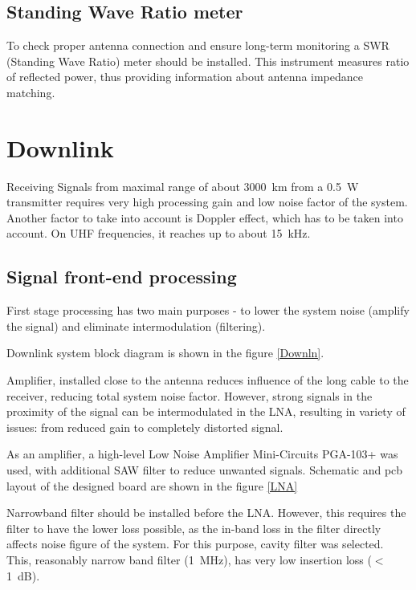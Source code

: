 \subsection{Standing Wave Ratio meter}
To check proper antenna connection and ensure long-term monitoring a SWR (Standing Wave Ratio) meter should be installed. This instrument measures ratio of reflected power, thus providing information about antenna impedance matching.





\section{Downlink}
Receiving Signals from maximal range of about \SI{3000}{\kilo\meter} from a \SI{0.5}{\watt} transmitter requires very high processing gain and low noise factor of the system. Another factor to take into account is Doppler effect, which has to be taken into account. On UHF frequencies, it reaches up to about \SI{15}{\kHz}.

\subsection{Signal front-end processing}
First stage processing has two main purposes - to lower the system noise (amplify the signal) and eliminate intermodulation (filtering).

Downlink system block diagram is shown in the figure \ref{Downln}.


Amplifier, installed close to the antenna reduces influence of the long cable to the receiver, reducing total system noise factor. However, strong signals in the proximity of the signal can be intermodulated in the LNA, resulting in variety of issues: from reduced gain to completely distorted signal.

As an amplifier, a high-level Low Noise Amplifier Mini-Circuits PGA-103+ was used, with additional SAW filter to reduce unwanted signals. Schematic and pcb layout of the designed board are shown in the figure \ref{LNA}


Narrowband filter should be installed before the LNA. However, this requires the filter to have the lower loss possible, as the in-band loss in the filter directly affects noise figure of the system. For this purpose, cavity filter was selected. This, reasonably narrow band filter (\SI{1}{\MHz}), has very low insertion loss ($<$\SI{1}{\dB}).


